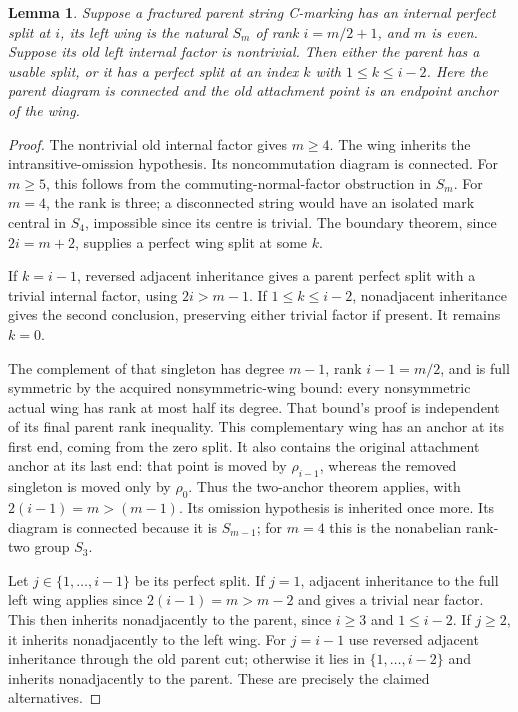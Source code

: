 \documentclass[11pt,a4paper]{article}
\newtheorem{lemma}{Lemma}
\begin{document}
\begin{lemma}\label{move}
Suppose a fractured parent string C-marking has an internal perfect split at $i$,
its left wing is the natural $S_m$ of rank $i=m/2+1$,
and $m$ is even. Suppose its old left internal factor is nontrivial. Then either the parent has a usable split, or
it has a perfect split at an index $k$ with $1\le k\le i-2$.
Here the parent diagram is connected and the old attachment point
is an endpoint anchor of the wing.
\end{lemma}
\begin{proof}
The nontrivial old internal factor gives $m\ge4$.
The wing inherits the intransitive-omission hypothesis.
Its noncommutation diagram is connected. For $m\ge5$, this follows
from the commuting-normal-factor obstruction in $S_m$.
For $m=4$, the rank is three; a disconnected string would have an
isolated mark central in $S_4$, impossible since its centre is trivial.
The boundary theorem, since $2i=m+2$, supplies a perfect wing split
at some $k$.

If $k=i-1$, reversed adjacent inheritance gives a parent perfect
split with a trivial internal factor, using $2i>m-1$.
If $1\le k\le i-2$, nonadjacent inheritance gives the second
conclusion, preserving either trivial factor if present.
It remains $k=0$.

The complement of that singleton has degree $m-1$, rank
$i-1=m/2$, and is full symmetric by the acquired nonsymmetric-wing
bound: every nonsymmetric actual wing has rank at most half its
degree. That bound's proof is independent of its final parent rank
inequality. This complementary wing has an anchor at its first end,
coming from the zero split. It also contains the original attachment
anchor at its last end: that point is moved by $\rho_{i-1}$,
whereas the removed singleton is moved only by $\rho_0$.
Thus the two-anchor theorem applies, with
$2(i-1)=m>(m-1)$. Its omission hypothesis is inherited once more.
Its diagram is connected because it is $S_{m-1}$; for $m=4$
this is the nonabelian rank-two group $S_3$.

Let $j\in\{1,\ldots,i-1\}$ be its perfect split.
If $j=1$, adjacent inheritance to the full left wing applies since
$2(i-1)=m>m-2$ and gives a trivial near factor. This then inherits
nonadjacently to the parent, since $i\ge3$ and $1\le i-2$.
If $j\ge2$, it inherits nonadjacently to the left wing.
For $j=i-1$ use reversed adjacent inheritance through the old
parent cut; otherwise it lies in $\{1,\ldots,i-2\}$ and
inherits nonadjacently to the parent. These are precisely the
claimed alternatives.
\end{proof}
\end{document}
